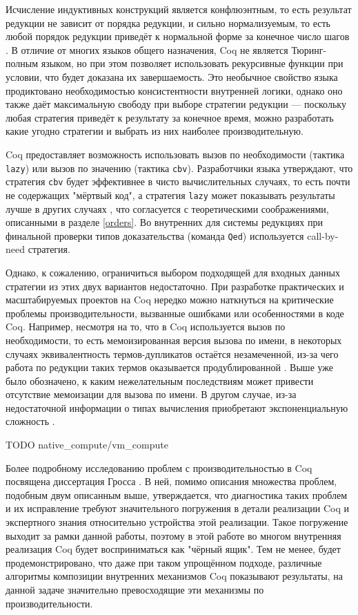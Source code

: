 \documentclass[../diploma.tex]{subfiles}
\begin{document}
Исчисление индуктивных конструкций является конфлюэнтным, то есть результат редукции не зависит от порядка редукции, и сильно нормализуемым, то есть любой порядок редукции приведёт к нормальной форме за конечное число шагов \cite{cic_proofs}. В отличие от многих языков общего назначения, Coq не является Тюринг-полным языком, но при этом позволяет использовать рекурсивные функции при условии, что будет доказана их завершаемость. Это необычное свойство языка продиктовано необходимостью консистентности внутренней логики, однако оно также даёт максимальную свободу при выборе стратегии редукции --- поскольку любая стратегия приведёт к результату за конечное время, можно разработать какие угодно стратегии и выбрать из них наиболее производительную.

Coq предоставляет возможность использовать вызов по необходимости (тактика \\\texttt{lazy}) или вызов по значению (тактика \texttt{cbv}). Разработчики языка утверждают, что стратегия \texttt{cbv} будет эффективнее в чисто вычислительных случаях, то есть почти не содержащих "мёртвый код", а стратегия \texttt{lazy} может показывать результаты лучше в других случаях \cite{coq}, что согласуется с теоретическими соображениями, описанными в разделе \ref{orders}. Во внутренних для системы редукциях при финальной проверки типов доказательства (команда \texttt{Qed}) используется call-by-need стратегия.

Однако, к сожалению, ограничиться выбором подходящей для входных данных стратегии из этих двух вариантов недостаточно. При разработке практических и масштабируемых проектов на Coq нередко можно наткнуться на критические проблемы производительности, вызванные ошибками или особенностями в коде Coq. Например, несмотря на то, что в Coq используется вызов по необходимости, то есть мемоизированная версия вызова по имени, в некоторых случаях эквивалентность термов-дупликатов остаётся незамеченной, из-за чего работа по редукции таких термов оказывается продублированной \cite{sharing_bug}. Выше уже было обозначено, к каким нежелательным последствиям может привести отсутствие мемоизации для вызова по имени. В другом случае, из-за недостаточной информации о типах вычисления приобретают экспоненциальную сложность \cite{letform_bug}.

TODO native_compute/vm_compute

Более подробному исследованию проблем с производительностью в Coq посвящена диссертация Гросса \cite{gross_phd}. В ней, помимо описания множества проблем, подобным двум описанным выше, утверждается, что диагностика таких проблем и их исправление требуют значительного погружения в детали реализации Coq и экспертного знания относительно устройства этой реализации. Такое погружение выходит за рамки данной работы, поэтому в этой работе во многом внутренняя реализация Coq будет восприниматься как "чёрный ящик". Тем не менее, будет продемонстрировано, что даже при таком упрощённом подходе, различные алгоритмы композиции внутренних механизмов Coq показывают результаты, на данной задаче значительно превосходящие эти механизмы по производительности.
\end{document}
